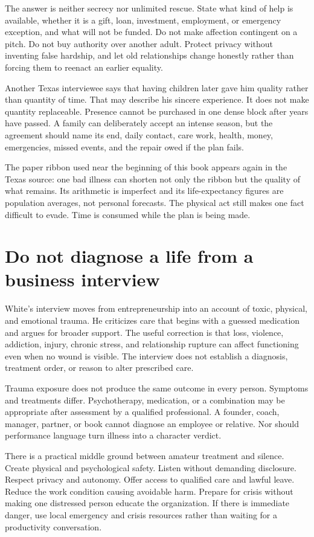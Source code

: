 The answer is neither secrecy nor unlimited rescue. State what kind of help is
available, whether it is a gift, loan, investment, employment, or emergency
exception, and what will not be funded. Do not make affection contingent on a
pitch. Do not buy authority over another adult. Protect privacy without
inventing false hardship, and let old relationships change honestly rather
than forcing them to reenact an earlier equality.

Another Texas interviewee says that having children later gave him quality
rather than quantity of time. That may describe his sincere experience. It
does not make quantity replaceable. Presence cannot be purchased in one dense
block after years have passed. A family can deliberately accept an intense
season, but the agreement should name its end, daily contact, care work,
health, money, emergencies, missed events, and the repair owed if the plan
fails.

The paper ribbon used near the beginning of this book appears again in the
Texas source: one bad illness can shorten not only the ribbon but the quality
of what remains. Its arithmetic is imperfect and its life-expectancy figures
are population averages, not personal forecasts. The physical act still makes
one fact difficult to evade. Time is consumed while the plan is being made.

\section{Do not diagnose a life from a business interview}

White's interview moves from entrepreneurship into an account of toxic,
physical, and emotional trauma. He criticizes care that begins with a guessed
medication and argues for broader support. The useful correction is that loss,
violence, addiction, injury, chronic stress, and relationship rupture can
affect functioning even when no wound is visible. The interview does not
establish a diagnosis, treatment order, or reason to alter prescribed care.

Trauma exposure does not produce the same outcome in every person. Symptoms
and treatments differ. Psychotherapy, medication, or a combination may be
appropriate after assessment by a qualified professional. A founder, coach,
manager, partner, or book cannot diagnose an employee or relative. Nor should
performance language turn illness into a character verdict.

There is a practical middle ground between amateur treatment and silence.
Create physical and psychological safety. Listen without demanding disclosure.
Respect privacy and autonomy. Offer access to qualified care and lawful leave.
Reduce the work condition causing avoidable harm. Prepare for crisis without
making one distressed person educate the organization. If there is immediate
danger, use local emergency and crisis resources rather than waiting for a
productivity conversation.

